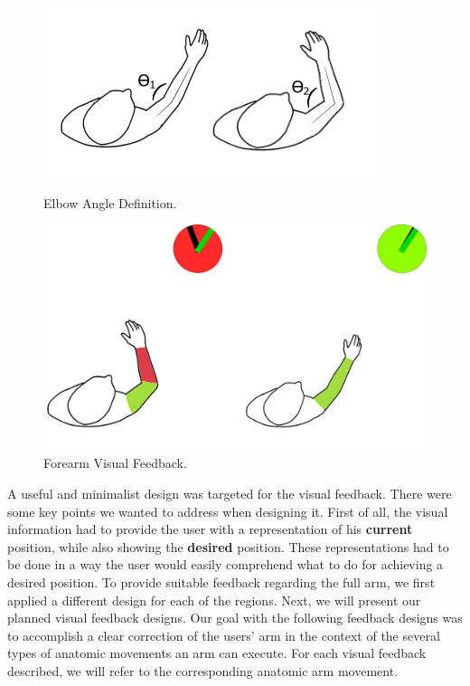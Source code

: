 \begin{figure}[!t]
  \centering
  \includegraphics[width=0.7\linewidth]{imgs/approach/elbowangle}
    \caption{Elbow Angle Definition.}
    \label{fig:elbowangle}
    \endminipage\hfill
{}
  \centering
  \includegraphics[width=0.9\linewidth]{imgs/approach/forearmfeedback}
    \caption{Forearm Visual Feedback.}
    \label{fig:forearmfeedback}
    \endminipage
\end{figure}




A useful and minimalist design was targeted for the visual feedback. There were some key points we wanted to address when designing it.
First of all, the visual information had to provide the user with a representation of his \textbf{current} position, while also showing the \textbf{desired} position. 
These representations had to be done in a way the user would easily comprehend what to do for achieving a desired position.
To provide suitable feedback regarding the full arm, we first applied a different design for each of the regions. Next, we will present our planned visual feedback designs.
Our goal with the following feedback designs was to accomplish a clear correction of the users' arm in the context of the several types of anatomic movements an arm can execute. 
For each visual feedback described, we will refer to the corresponding anatomic arm movement.

